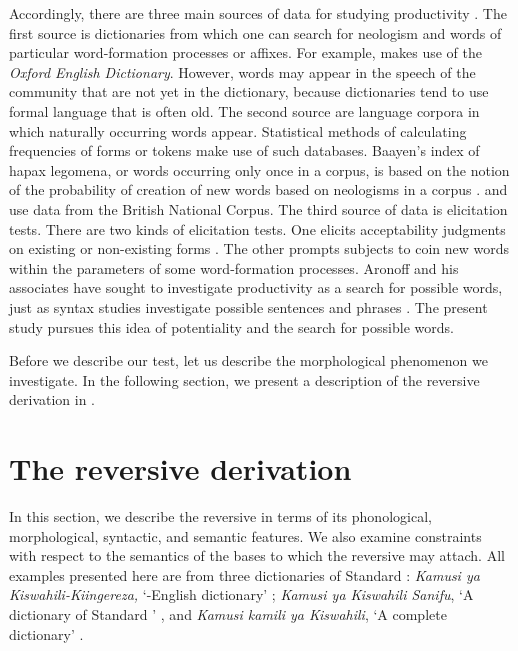 \documentclass[output=paper]{langsci/langscibook}
\begin{document}
Accordingly, there are three main sources of data for studying productivity \citep{Plag2006,SchroederMuehleisen2010,Bolozky1999}. The first source is dictionaries from which one can search for neologism and words of particular word-formation processes or affixes. For example, \citet{Fernandez-Dominguez2013} makes use of the \textit{Oxford English Dictionary}. However, words may appear in the speech of the community that are not yet in the dictionary, because dictionaries tend to use formal language that is often old. The second source are language corpora in which naturally occurring words appear. Statistical methods of calculating frequencies of forms or tokens make use of such databases. Baayen’s index of hapax legomena, or words occurring only once in a corpus, is based on the notion of the probability of creation of new words based on neologisms in a corpus \citep{Baayen1992}. \citet{Plag2006} and \citet{Fernandez-Dominguez2013} use data from the British National Corpus. The third source of data is elicitation tests. There are two kinds of elicitation tests. One elicits acceptability judgments on existing or non-existing forms \citep{AronoffSchvaneveldt1978}. The other prompts subjects to coin new words within the parameters of some word-formation processes. Aronoff and his associates have sought to investigate productivity as a search for possible words, just as syntax studies investigate possible sentences and phrases \citep{Aronoff1976}. The present study pursues this idea of potentiality and the search for possible words.

Before we describe our test, let us describe the morphological phenomenon we investigate. In the following section, we present a description of the reversive derivation in . 

\section{The reversive derivation} \label{sec:ngonyaningowa:3}

In this section, we describe the reversive in terms of its phonological, morphological, syntactic, and semantic features. We also examine constraints with respect to the semantics of the bases to which the reversive may attach. All examples presented here are from three dictionaries of Standard : \textit{Kamusi ya {Kiswahili}-Kiingereza,} ‘-English dictionary’ \citep{TUKI2001}; \textit{Kamusi ya {Kiswahili} Sanifu}, ‘A dictionary of Standard ’ \citep{TUKI2004}, and \textit{Kamusi kamili ya Kiswahili}, ‘A complete  dictionary’ \citep{Mdeeetal2009}.
\end{document}
